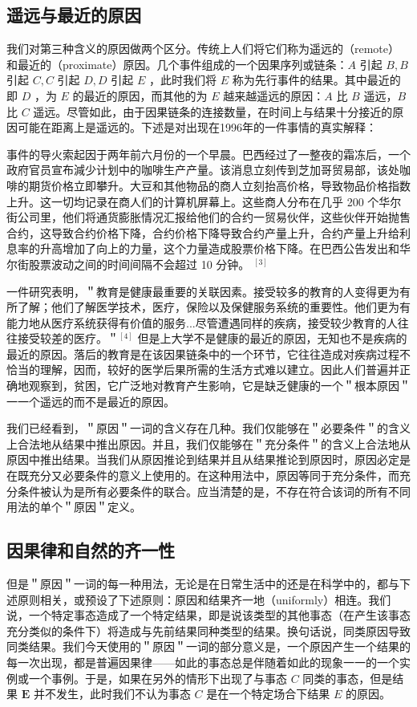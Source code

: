 \subsection{遥远与最近的原因}

我们对第三种含义的原因做两个区分。传统上人们将它们称为遥远的（remote）和最近的（proximate）原因。几个事件组成的一个因果序列或链条：$A$ 引起 $B, B$ 引起 $C, C$ 引起 $D, D$ 引起 $E$ ，此时我们将 $E$ 称为先行事件的结果。其中最近的即 $D$ ，为 $E$ 的最近的原因，而其他的为 $E$ 越来越遥远的原因：$A$ 比 $B$ 遥远，$B$ 比 $C$ 遥远。尽管如此，由于因果链条的连接数量，在时间上与结果十分接近的原因可能在距离上是遥远的。下述是对出现在1996年的一件事情的真实解释：

事件的导火索起因于两年前六月份的一个早晨。巴西经过了一整夜的霜冻后，一个政府官员宣布減少计划中的咖啡生产产量。该消息立刻传到芝加哥贸易部，该处咖啡的期货价格立即攀升。大豆和其他物品的商人立刻抬高价格，导致物品价格指数上升。这一切均记录在商人们的计算机屏幕上。这些商人分布在几乎 200 个华尔街公司里，他们将通货膨胀情况汇报给他们的合约一贸易伙伴，这些伙伴开始抛售合约，这导致合约价格下降，合约价格下降导致合约产量上升，合约产量上升给利息率的升高增加了向上的力量，这个力量造成股票价格下降。在巴西公告发出和华尔街股票波动之间的时间间隔不会超过 10 分钟。 ${ }^{[3]}$

一件研究表明，＂教育是健康最重要的关联因素。接受较多的教育的人变得更为有所了解；他们了解医学技术，医疗，保险以及保健服务系统的重要性。他们更为有能力地从医疗系统获得有价值的服务...尽管遭遇同样的疾病，接受较少教育的人往往接受较差的医疗。＂${ }^{[4]}$ 但是上大学不是健康的最近的原因，无知也不是疾病的最近的原因。落后的教育是在该因果链条中的一个环节，它往往造成对疾病过程不恰当的理解，因而，较好的医学后果所需的生活方式难以建立。因此人们普遍并正确地观察到，贫困，它广泛地对教育产生影响，它是缺乏健康的一个＂根本原因＂一一个遥远的而不是最近的原因。

我们已经看到，＂原因＂一词的含义存在几种。我们仅能够在＂必要条件＂的含义上合法地从结果中推出原因。并且，我们仅能够在＂充分条件＂的含义上合法地从原因中推出结果。当我们从原因推论到结果并且从结果推论到原因时，原因必定是在既充分又必要条件的意义上使用的。在这种用法中，原因等同于充分条件，而充分条件被认为是所有必要条件的联合。应当清楚的是，不存在符合该词的所有不同用法的单个＂原因＂定义。

\subsection{因果律和自然的齐一性}

但是＂原因＂一词的每一种用法，无论是在日常生活中的还是在科学中的，都与下述原则相关，或预设了下述原则：原因和结果齐一地（uniformly）相连。我们说，一个特定事态造成了一个特定结果，即是说该类型的其他事态（在产生该事态充分类似的条件下）将造成与先前结果同种类型的结果。换句话说，同类原因导致同类结果。我们今天使用的＂原因＂一词的部分意义是，一个原因产生一个结果的每一次出现，都是普遍因果律——如此的事态总是伴随着如此的现象一一的一个实例或一个事例。于是，如果在另外的情形下出现了与事态 $C$ 同类的事态，但是结果 $\boldsymbol{E}$ 并不发生，此时我们不认为事态 $C$ 是在一个特定场合下结果 $E$ 的原因。

